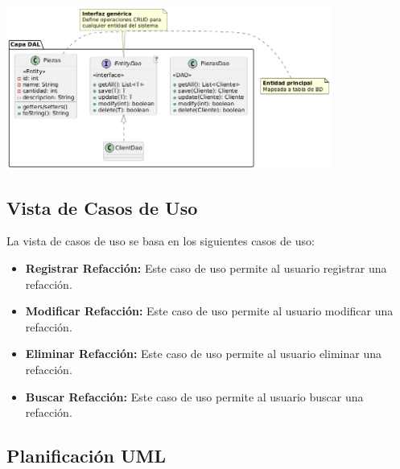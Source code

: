 \begin{itemize}
\begin{center}
        \includegraphics[width=0.8\textwidth]{imag/ImagenDiagramaUmlCapaAccesoDatos.png}
        \newline
    \end{center}
\end{itemize}

\subsection*{Vista de Casos de Uso}

    La vista de casos de uso se basa en los siguientes casos de uso:
    \begin{itemize}
        \item \textbf{Registrar Refacción:} Este caso de uso permite al usuario registrar una refacción.
        \item \textbf{Modificar Refacción:} Este caso de uso permite al usuario modificar una refacción.
        \item \textbf{Eliminar Refacción:} Este caso de uso permite al usuario eliminar una refacción.
        \item \textbf{Buscar Refacción:} Este caso de uso permite al usuario buscar una refacción.
    \end{itemize}
\subsection*{Planificación UML}
\centering
